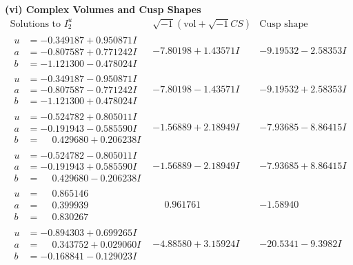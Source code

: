 \documentclass[1p]{elsarticle_modified}
\theoremstyle{definition}
\newcommand{\I}{\sqrt{-1}}
\begin{document}
\newpage\flushleft \textbf{(vi) Complex Volumes and Cusp Shapes}
$$\begin{array}{c|c|c}  
\text{Solutions to }I^u_{2}& \I (\text{vol} + \sqrt{-1}CS) & \text{Cusp shape}\\
 \hline 
\begin{aligned}
u &= -0.349187 + 0.950871 I \\
a &= -0.807587 + 0.771242 I \\
b &= -1.121300 - 0.478024 I\end{aligned}
 & -7.80198 + 1.43571 I & -9.19532 - 2.58353 I \\ \hline\begin{aligned}
u &= -0.349187 - 0.950871 I \\
a &= -0.807587 - 0.771242 I \\
b &= -1.121300 + 0.478024 I\end{aligned}
 & -7.80198 - 1.43571 I & -9.19532 + 2.58353 I \\ \hline\begin{aligned}
u &= -0.524782 + 0.805011 I \\
a &= -0.191943 - 0.585590 I \\
b &= \phantom{-}0.429680 + 0.206238 I\end{aligned}
 & -1.56889 + 2.18949 I & -7.93685 - 8.86415 I \\ \hline\begin{aligned}
u &= -0.524782 - 0.805011 I \\
a &= -0.191943 + 0.585590 I \\
b &= \phantom{-}0.429680 - 0.206238 I\end{aligned}
 & -1.56889 - 2.18949 I & -7.93685 + 8.86415 I \\ \hline\begin{aligned}
u &= \phantom{-}0.865146\phantom{ +0.000000I} \\
a &= \phantom{-}0.399939\phantom{ +0.000000I} \\
b &= \phantom{-}0.830267\phantom{ +0.000000I}\end{aligned}
 & \phantom{-}0.961761\phantom{ +0.000000I} & -1.58940\phantom{ +0.000000I} \\ \hline\begin{aligned}
u &= -0.894303 + 0.699265 I \\
a &= \phantom{-}0.343752 + 0.029060 I \\
b &= -0.168841 - 0.129023 I\end{aligned}
 & -4.88580 + 3.15924 I & -20.5341 - 9.3982 I \\ \hline\begin{aligned}

\end{aligned}
\end{array}$$
\end{document}
